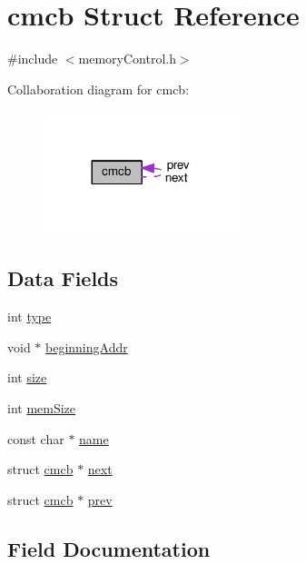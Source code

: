 \hypertarget{structcmcb}{}\section{cmcb Struct Reference}
\label{structcmcb}


{\ttfamily \#include $<$memory\+Control.\+h$>$}



Collaboration diagram for cmcb\+:\nopagebreak
\begin{figure}[H]
\begin{center}
\leavevmode
\includegraphics[width=161pt]{structcmcb__coll__graph}
\end{center}
\end{figure}
\subsection*{Data Fields}
\begin{DoxyCompactItemize}
\item 
int \hyperlink{structcmcb_ac765329451135abec74c45e1897abf26}{type}
\item 
void $\ast$ \hyperlink{structcmcb_a2f9031157d525501090fbadf7a1783cd}{beginning\+Addr}
\item 
int \hyperlink{structcmcb_a439227feff9d7f55384e8780cfc2eb82}{size}
\item 
int \hyperlink{structcmcb_af9658f4d1c59d6d251445c83931f0e55}{mem\+Size}
\item 
const char $\ast$ \hyperlink{structcmcb_a8f8f80d37794cde9472343e4487ba3eb}{name}
\item 
struct \hyperlink{structcmcb}{cmcb} $\ast$ \hyperlink{structcmcb_ae83456b67ed4fecca2703e070657e3c5}{next}
\item 
struct \hyperlink{structcmcb}{cmcb} $\ast$ \hyperlink{structcmcb_a6fd7de8eeff4983e21309c07178f6a77}{prev}
\end{DoxyCompactItemize}


\subsection{Field Documentation}
